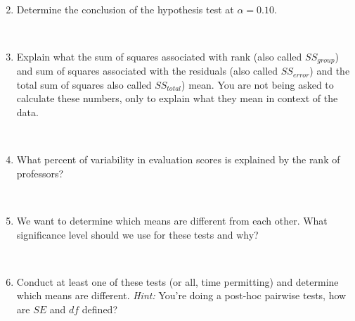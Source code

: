 \documentclass[12pt]{article}
\newcommand{\soln}[2]{$\:$\\ \vspace{#1}}{}
\begin{document}
\begin{enumerate}
\soln{2cm}
{
\begin{itemize}
\item Df: $df_G = 3 - 1 = 2$, $df_T = (102 + 108 + 253) - 1 = 462$, $df_E = 462 - 2 = 460$ \\
\item SS: $SS_E = 136.66 - 1.59 = 135.07$ \\
\item MS: $MS_G = 1.59 / 2 = 0.795$, $MS_E = 135.07 / 460 = 0.29$ \\
\item F = 0.795 / 0.29 = 2.74 \\
\item p-value = \texttt{pf(2.74, df1 = 2, df2 = 460, lower.tail = FALSE)} = 0.066
\end{itemize}
}

\item Determine the conclusion of the hypothesis test at $\alpha = 0.10$.

\soln{3cm}
{
Reject $H_0$. At least one pair of means are different from each other.
}

\item Explain what the sum of squares associated with rank (also called $SS_{group}$) and sum of squares 
associated with the residuals (also called $SS_{error}$) and the total sum of squares also called $SS_{total}$) mean. You are not being 
asked to calculate these numbers, only to explain what they mean in context of the data.

\soln{5cm}
{
$SS_G$: Variability between groups \\
$SS_E$: Variability within groups \\
$SS_T$: Total variability in evaluation scores
}

\pagebreak

\item What percent of variability in evaluation scores is explained by the rank of professors?

\soln{3cm}
{$SS_G / SS_T = 1.59 / 136.66 = 0.0116 \rightarrow 1.16\%$}

\item We want to determine which means are different from each other. What significance level should we use 
for these tests and why?

\soln{3cm}
{
$\alpha^\star = 0.10 / 3 = 0.033$
}

\item Conduct at least one of these tests (or all, time permitting) and determine which means are different.
\textit{Hint:} You're doing a post-hoc pairwise tests, how are $SE$ and $df$ defined?


\end{enumerate}
\end{document}
